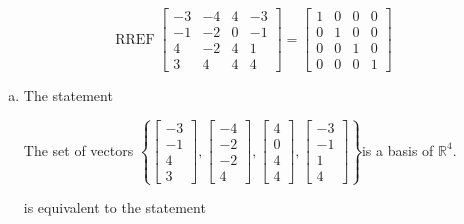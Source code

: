 \begin{exerciseAnswer} 


\[\operatorname{RREF} \left[\begin{array}{cccc}
-3 & -4 & 4 & -3 \\
-1 & -2 & 0 & -1 \\
4 & -2 & 4 & 1 \\
3 & 4 & 4 & 4
\end{array}\right] = \left[\begin{array}{cccc}
1 & 0 & 0 & 0 \\
0 & 1 & 0 & 0 \\
0 & 0 & 1 & 0 \\
0 & 0 & 0 & 1
\end{array}\right] \]


\begin{enumerate}[(a)]
\item The statement 
\begin{center}\begin{minipage}{0.8\textwidth}
 The set of vectors \( \left\{ \left[\begin{array}{c}
-3 \\
-1 \\
4 \\
3
\end{array}\right] , \left[\begin{array}{c}
-4 \\
-2 \\
-2 \\
4
\end{array}\right] , \left[\begin{array}{c}
4 \\
0 \\
4 \\
4
\end{array}\right] , \left[\begin{array}{c}
-3 \\
-1 \\
1 \\
4
\end{array}\right] \right\} \)is a basis of \(\mathbb{R}^4\). 
\end{minipage}\end{center}
     is equivalent to the statement 
\begin{center}\begin{minipage}{0.8\textwidth}
 The set of vectors \( \left\{ \left[\begin{array}{c}
-3 \\
-1 \\

\end{array}
\end{minipage}
\end{center}
\end{enumerate}
\end{exerciseAnswer}
